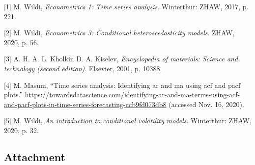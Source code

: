 \documentclass[
]{article}
\newenvironment{cslreferences}%
  {}%
  {\par}
\begin{document}
\hypertarget{refs}{}
\begin{cslreferences}
\leavevmode\hypertarget{ref-eco1}{}%
{[}1{]} M. Wildi, \emph{Econometrics 1: Time series analysis}.
Winterthur: ZHAW, 2017, p. 221.

\leavevmode\hypertarget{ref-slide_eco3_1}{}%
{[}2{]} M. Wildi, \emph{Econometrics 3: Conditional heteroscedasticity
models}. ZHAW, 2020, p. 56.

\leavevmode\hypertarget{ref-acf}{}%
{[}3{]} A. H. A. L. Kholkin D. A. Kiselev, \emph{Encyclopedia of
materials: Science and technology (second edition)}. Elsevier, 2001, p.
10388.

\leavevmode\hypertarget{ref-arima}{}%
{[}4{]} M. Masum, ``Time series analysis: Identifying ar and ma using
acf and pacf plots.''
\url{https://towardsdatascience.com/identifying-ar-and-ma-terms-using-acf-and-pacf-plots-in-time-series-forecasting-ccb9fd073db8}
(accessed Nov. 16, 2020).

\leavevmode\hypertarget{ref-eco2}{}%
{[}5{]} M. Wildi, \emph{An introduction to conditional volatility
models}. Winterthur: ZHAW, 2020, p. 32.
\end{cslreferences}

\newpage

\hypertarget{attachment}{%
\subsection{Attachment}\label{attachment}}
\end{document}
